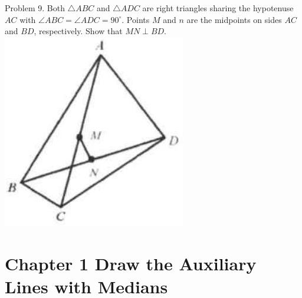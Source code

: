 \documentclass[10pt]{article}
\begin{document}
Problem 9. Both \(\triangle A B C\) and \(\triangle A D C\) are right triangles sharing the hypotenuse \(A C\) with \(\angle A B C=\angle A D C=90^{\circ}\). Points \(M\) and \(n\) are the midpoints on sides \(A C\) and \(B D\), respectively. Show that \(M N \perp B D\).\\
\includegraphics[max width=\textwidth, center]{2025_04_17_97bc1f7e44d93c271a88g-016(3)}

\section*{Chapter 1 Draw the Auxiliary Lines with Medians}
\end{document}
